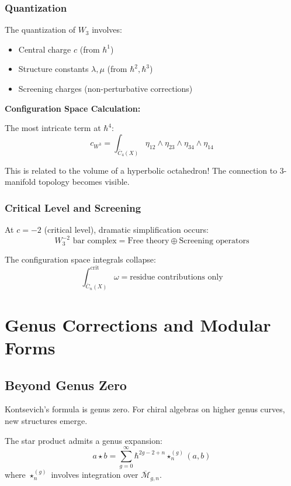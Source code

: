 \subsubsection{Quantization}

The quantization of $W_3$ involves:
\begin{itemize}
\item Central charge $c$ (from $\hbar^1$)
\item Structure constants $\lambda, \mu$ (from $\hbar^2, \hbar^3$)
\item Screening charges (non-perturbative corrections)
\end{itemize}

\textbf{Configuration Space Calculation:}

The most intricate term at $\hbar^4$:
$$c_{W^3} = \int_{\overline{C}_4(X)} \eta_{12} \wedge \eta_{23} \wedge \eta_{34} \wedge \eta_{14}$$

This is related to the volume of a hyperbolic octahedron! The connection to 3-manifold topology becomes visible.

\subsubsection{Critical Level and Screening}

At $c = -2$ (critical level), dramatic simplification occurs:
$$W_3^{-2} \text{ bar complex} = \text{Free theory} \oplus \text{Screening operators}$$

The configuration space integrals collapse:
$$\int_{\overline{C}_n(X)}^{\text{crit}} \omega = \text{residue contributions only}$$

\section{Genus Corrections and Modular Forms}

\subsection{Beyond Genus Zero}

Kontsevich's formula is genus zero. For chiral algebras on higher genus curves, new structures emerge.

\begin{theorem}
The star product admits a genus expansion:
$$a \star b = \sum_{g=0}^\infty \hbar^{2g-2+n} \star^{(g)}_n(a,b)$$
where $\star^{(g)}_n$ involves integration over $\overline{\mathcal{M}}_{g,n}$.
\end{theorem}

